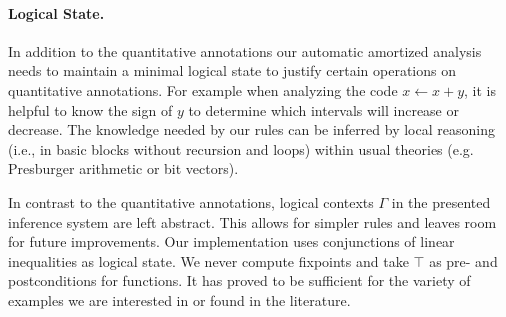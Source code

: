 \documentclass[nocopyrightspace,preprint]{sigplanconf}
\begin{document}
\paragraph{Logical State.}

In addition to the quantitative annotations our automatic amortized
analysis needs to maintain a minimal logical state to justify certain
operations on quantitative annotations.  For example when analyzing
the code $x \gets x + y$, it is helpful to know the sign of $y$ to
determine which intervals will increase or decrease.  The knowledge
needed by our rules can be inferred by local reasoning (i.e., in
basic blocks without recursion and loops) within usual theories
(e.g. Presburger arithmetic or bit vectors).

In contrast to the quantitative annotations, logical contexts $\Gamma$
in the presented inference system are left abstract.  This allows for
simpler rules and leaves room for future improvements.
%
Our implementation uses conjunctions of linear inequalities as
logical state.  We never compute fixpoints and take $\top$
as pre- and postconditions for functions. It has proved to be
sufficient for the variety of examples we are interested in or found
in the literature.
\end{document}
